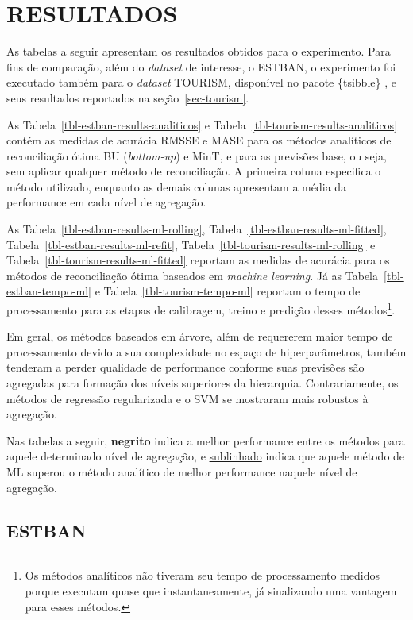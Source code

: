 \documentclass[
  12pt,
  twoside,
  openright,
  a4paper,
  chapter=TITLE,
  section=TITLE,
  brazil]{abntex2}
\begin{document}
\section{RESULTADOS}\label{resultados}

As tabelas a seguir apresentam os resultados obtidos para o experimento.
Para fins de comparação, além do \emph{dataset} de interesse, o ESTBAN,
o experimento foi executado também para o \emph{dataset} TOURISM,
disponível no pacote \{tsibble\} \autocite{R-tsibble}, e seus resultados
reportados na seção~\ref{sec-tourism}.

As Tabela~\ref{tbl-estban-results-analiticos} e
Tabela~\ref{tbl-tourism-results-analiticos} contém as medidas de
acurácia RMSSE e MASE para os métodos analíticos de reconciliação ótima
BU (\emph{bottom-up}) e MinT, e para as previsões base, ou seja, sem
aplicar qualquer método de reconciliação. A primeira coluna especifica o
método utilizado, enquanto as demais colunas apresentam a média da
performance em cada nível de agregação.

As Tabela~\ref{tbl-estban-results-ml-rolling},
Tabela~\ref{tbl-estban-results-ml-fitted},
Tabela~\ref{tbl-estban-results-ml-refit},
Tabela~\ref{tbl-tourism-results-ml-rolling} e
Tabela~\ref{tbl-tourism-results-ml-fitted} reportam as medidas de
acurácia para os métodos de reconciliação ótima baseados em
\emph{machine learning}. Já as Tabela~\ref{tbl-estban-tempo-ml} e
Tabela~\ref{tbl-tourism-tempo-ml} reportam o tempo de processamento para
as etapas de calibragem, treino e predição desses métodos\footnote{Os
  métodos analíticos não tiveram seu tempo de processamento medidos
  porque executam quase que instantaneamente, já sinalizando uma
  vantagem para esses métodos.}.

Em geral, os métodos baseados em árvore, além de requererem maior tempo
de processamento devido a sua complexidade no espaço de hiperparâmetros,
também tenderam a perder qualidade de performance conforme suas
previsões são agregadas para formação dos níveis superiores da
hierarquia. Contrariamente, os métodos de regressão regularizada e o SVM
se mostraram mais robustos à agregação.

Nas tabelas a seguir, \textbf{negrito} indica a melhor performance entre
os métodos para aquele determinado nível de agregação, e
\underline{sublinhado} indica que aquele método de ML superou o método
analítico de melhor performance naquele nível de agregação.

\subsection{ESTBAN}\label{estban}
\end{document}
